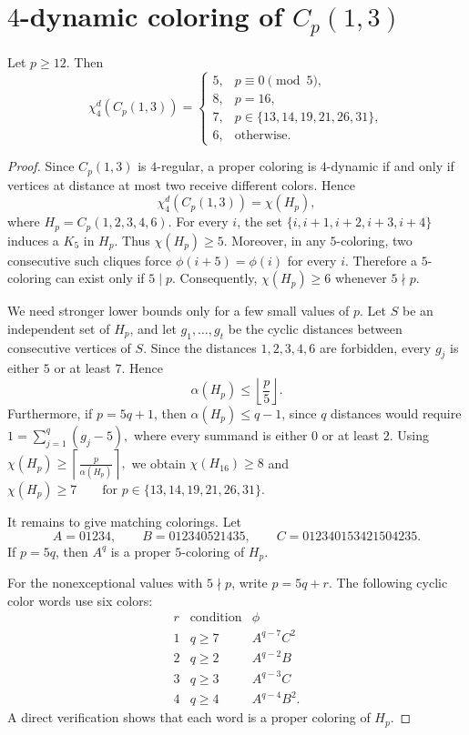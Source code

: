 \section{$4$-dynamic coloring of $C_p(1,3)$}

\begin{theorem}\label{thm:circulant-r4}
Let $p\ge12$. Then
\[
\chi_4^d(C_p(1,3))=
\begin{cases}
5, & p\equiv0\pmod5,\\
8, & p=16,\\
7, & p\in\{13,14,19,21,26,31\},\\
6, & \text{otherwise}.
\end{cases}
\]
\end{theorem}

\begin{proof}
Since $C_p(1,3)$ is $4$-regular, a proper coloring is $4$-dynamic
if and only if vertices at distance at most two receive different
colors. Hence
\[
\chi_4^d(C_p(1,3))=\chi(H_p),
\]
where
$H_p=C_p(1,2,3,4,6)$.
For every $i$, the set
$
\{i,i+1,i+2,i+3,i+4\}
$
induces a $K_5$ in $H_p$. Thus $\chi(H_p)\ge5$. Moreover, in any
$5$-coloring, two consecutive such cliques force
$
\phi(i+5)=\phi(i)
$
for every $i$. Therefore a $5$-coloring can exist only if $5\mid p$.
Consequently,
$
\chi(H_p)\ge6
$
whenever $5\nmid p$.

We need stronger lower bounds only for a few small values of $p$.
Let $S$ be an independent set of $H_p$, and let
$g_1,\ldots,g_t$ be the cyclic distances between consecutive vertices of
$S$. Since the distances $1,2,3,4,6$ are forbidden, every $g_j$ is
either $5$ or at least $7$. Hence
\[
\alpha(H_p)\le\left\lfloor\frac p5\right\rfloor.
\]
Furthermore, if $p=5q+1$, then $\alpha(H_p)\le q-1$, since $q$
distances would require
$
1=\sum_{j=1}^q(g_j-5),
$
where every summand is either $0$ or at least $2$.
Using
$
\chi(H_p)\ge
\left\lceil\frac{p}{\alpha(H_p)}\right\rceil,
$
we obtain
$
\chi(H_{16})\ge8
$
and
$
\chi(H_p)\ge7
\qquad
\text{for }p\in\{13,14,19,21,26,31\}.
$

It remains to give matching colorings. Let
\[
A=01234,\qquad
B=012340521435,\qquad
C=012340153421504235.
\]
If $p=5q$, then $A^q$ is a proper $5$-coloring of $H_p$.

For the nonexceptional values with $5\nmid p$, write $p=5q+r$.
The following cyclic color words use six colors:
\[
\begin{array}{c|c|c}
r & \text{condition} & \phi\\ \hline
1 & q\ge7 & A^{q-7}C^2\\
2 & q\ge2 & A^{q-2}B\\
3 & q\ge3 & A^{q-3}C\\
4 & q\ge4 & A^{q-4}B^2.
\end{array}
\]
A direct verification shows that each word is a proper coloring of
$H_p$.


\end{proof}

